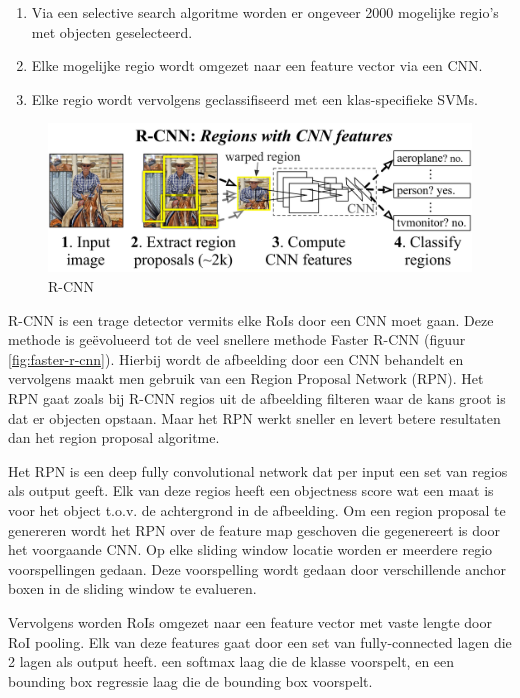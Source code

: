 \begin{enumerate}
    \item Via een selective search algoritme worden er ongeveer 2000 mogelijke regio's met objecten geselecteerd.
    \item Elke mogelijke regio wordt omgezet naar een feature vector via een CNN.
    \item Elke regio wordt vervolgens geclassifiseerd met een klas-specifieke SVMs.
\end{enumerate}

\begin{figure}[!ht]
	\centering
	\includegraphics[width=0.70\linewidth]{fig/R-CNN.jpg}
	\caption{R-CNN}
	\label{fig:r-cnn}
\end{figure}

R-CNN is een trage detector vermits elke RoIs door een CNN moet gaan. 
Deze methode is ge\"evolueerd tot de veel snellere methode Faster R-CNN (figuur \ref{fig:faster-r-cnn}). 
Hierbij wordt de afbeelding door een CNN behandelt en vervolgens maakt men gebruik van een Region Proposal Network (RPN). 
Het RPN gaat zoals bij R-CNN regios uit de afbeelding filteren waar de kans groot is dat er objecten opstaan.
Maar het RPN werkt sneller en levert betere resultaten dan het region proposal algoritme. 

Het RPN is een deep fully convolutional network dat per input een set van regios als output geeft.
Elk van deze regios heeft een objectness score wat een maat is voor het object t.o.v. de achtergrond in de afbeelding.
Om een region proposal te genereren wordt het RPN over de feature map geschoven die gegenereert is door het voorgaande CNN.
Op elke sliding window locatie worden er meerdere regio voorspellingen gedaan.
Deze voorspelling wordt gedaan door verschillende anchor boxen in de sliding window te evalueren.

Vervolgens worden RoIs omgezet naar een feature vector met vaste lengte door RoI pooling.
Elk van deze features gaat door een set van fully-connected lagen die 2 lagen als output heeft.
een softmax laag die de klasse voorspelt, en een bounding box regressie laag die de bounding box voorspelt.

